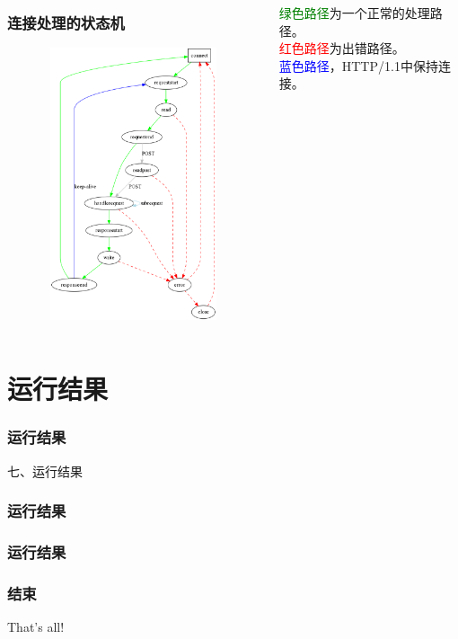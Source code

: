 \documentclass[10pt,dvipdfm]{beamer}
\begin{document}
\begin{frame}
	\begin{columns}
	
	\begin{column}{0.6\textwidth}
		\frametitle{连接处理的状态机}
		\begin{figure}[htbp]
		\centering
		\includegraphics[height=8cm, width=6cm]{state.eps}
		\end{figure}
	\end{column}
	
	\begin{column}{0.3\textwidth}
		\begin{block}{}
			\textcolor{green}{绿色路径}为一个正常的处理路径。\\
			
			\textcolor{red}{红色路径}为出错路径。\\
			
			\textcolor{blue}{蓝色路径}，HTTP/1.1中保持连接。
		\end{block}
	\end{column}
	
	\end{columns}
	
\end{frame}

\section{运行结果}

\begin{frame}
	\frametitle{运行结果}
	\begin{center}
	{\Large
		七、运行结果
	}
	\end{center}
\end{frame}

\begin{frame}
	\frametitle{运行结果}
\end{frame}

\begin{frame}
	\frametitle{运行结果}
\end{frame}

\begin{frame}
	\frametitle{结束}
	\begin{center}
	{\Huge
		That's all!
	}
	\end{center}
\end{frame}
\end{document}
